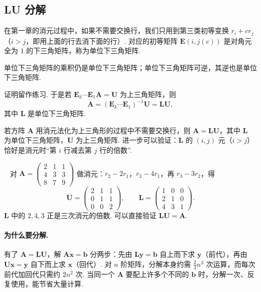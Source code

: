 \documentclass[lang=cn,10.5pt,scheme=chinese,toc=twocol,section,chinesefont=nofont,
twoside,citestyle=gb7714-2015,bibstyle=gb7714-2015]{elegantbook}
\DeclareRobustCommand{\textbf}[1]{{\lnsemiboldlatin\lnsemiboldcjk #1}}
\newcommand{\vv}[1]{\boldsymbol{#1}}
\numberwithin{equation}{section}   %
\newcommand*{\lnlabel}[1]{{\sffamily\bfseries\color{black}#1}}
\renewenvironment{example}[1][]{%
	\refstepcounter{exam}%
	\par\noindent\lnlabel{\examplename\ \theexam\ifblank{#1}{}{\ #1}}\ \rmfamily}{%
	\par\ignorespacesafterend}
\begin{document}
\subsection{LU 分解}

在第一章的消元过程中，如果\textbf{不需要交换行}，我们只用到第三类初等变换 $r_i+cr_j$（$i>j$，即用上面的行去消下面的行）. 对应的初等矩阵 $\vv E(i,j(c))$ 是对角元全为 $1$ 的下三角矩阵，称为\textbf{单位下三角矩阵}.

\begin{lemma}
  单位下三角矩阵的乘积仍是单位下三角矩阵；单位下三角矩阵可逆，其逆也是单位下三角矩阵.
\end{lemma}

证明留作练习. 于是若 $\vv E_k\cdots\vv E_1\vv A=\vv U$ 为上三角矩阵，则
\[\vv A=(\vv E_k\cdots\vv E_1)^{-1}\vv U=\vv L\vv U,\]
其中 $\vv L$ 是单位下三角矩阵.

\begin{theorem}[LU 分解]\label{thm:lu}
  若方阵 $\vv A$ 用消元法化为上三角形的过程中不需要交换行，则 $\vv A=\vv{LU}$，其中 $\vv L$ 为单位下三角矩阵，$\vv U$ 为上三角矩阵. 进一步可以验证：$\vv L$ 的 $(i,j)$ 元（$i>j$）恰好是消元时“第 $i$ 行减去第 $j$ 行的倍数”.
\end{theorem}

\begin{example}
  对 $\vv A=
    \begin{pmatrix}
      2 & 1 & 1 \\4&3&3\\8&7&9
    \end{pmatrix}
  $ 做消元：$r_2-2r_1$，$r_3-4r_1$，再 $r_3-3r_2$，得
  \[
    \vv U=
    \begin{pmatrix}
      2 & 1 & 1 \\0&1&1\\0&0&2
    \end{pmatrix}
    ,\qquad
    \vv L=
    \begin{pmatrix}
      1 & 0 & 0 \\2&1&0\\4&3&1
    \end{pmatrix}
    .
  \]
  $\vv L$ 中的 $2,4,3$ 正是三次消元的倍数. 可以直接验证 $\vv{LU}=\vv A$.
\end{example}

\paragraph*{为什么要分解.} 有了 $\vv A=\vv{LU}$，解 $\vv{Ax}=\vv b$ 分两步：先由 $\vv{Ly}=\vv b$ 自上而下求 $\vv y$（\textbf{前代}），再由 $\vv{Ux}=\vv y$ 自下而上求 $\vv x$（\textbf{回代}）. 对 $n$ 阶矩阵，分解本身约需 $\frac23n^3$ 次运算，而每次前代加回代只需约 $2n^2$ 次. 当同一个 $\vv A$ 要配上\textbf{许多个不同的} $\vv b$ 时，分解一次、反复使用，能节省大量计算.
\end{document}

